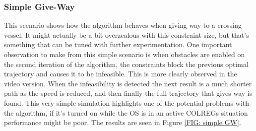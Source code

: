 \subsubsection{Simple Give-Way}
This scenario shows how the algorithm behaves when giving way to a crossing vessel. It might actually be a bit overzealous with this
constraint size, but that's something that can be tuned with further experimentation. One important observation to make from this
simple scenario is when obstacles are enabled on the second iteration of the algorithm, the constraints block the previous optimal
trajectory and causes it to be infeasible. This is more clearly observed in the video version. When the infeasibility is detected
the next result is a much shorter path as the speed is reduced, and then finally the full trajectory that gives way is found.
This very simple simulation highlights one of the potential problems with the algorithm, if it's turned on while the OS is in an active
COLREGs situation performance might be poor. The results are seen in Figure \ref{FIG: simple GW}.

